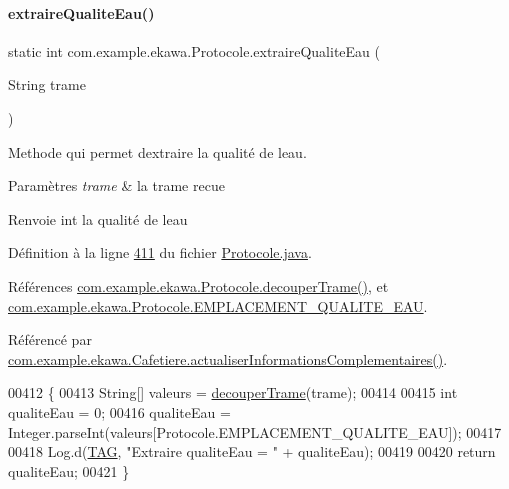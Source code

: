 \paragraph{\texorpdfstring{extraire\+Qualite\+Eau()}{extraireQualiteEau()}}
{\footnotesize\ttfamily static int com.\+example.\+ekawa.\+Protocole.\+extraire\+Qualite\+Eau (\begin{DoxyParamCaption}\item[{String}]{trame }\end{DoxyParamCaption})\hspace{0.3cm}{\ttfamily [static]}}



Methode qui permet d\textquotesingle{}extraire la qualité de l\textquotesingle{}eau. 


\begin{DoxyParams}{Paramètres}
{\em trame} & la trame recue \\
\hline
\end{DoxyParams}
\begin{DoxyReturn}{Renvoie}
int la qualité de l\textquotesingle{}eau 
\end{DoxyReturn}


Définition à la ligne \hyperlink{_protocole_8java_source_l00411}{411} du fichier \hyperlink{_protocole_8java_source}{Protocole.\+java}.



Références \hyperlink{_protocole_8java_source_l00208}{com.\+example.\+ekawa.\+Protocole.\+decouper\+Trame()}, et \hyperlink{_protocole_8java_source_l00068}{com.\+example.\+ekawa.\+Protocole.\+E\+M\+P\+L\+A\+C\+E\+M\+E\+N\+T\+\_\+\+Q\+U\+A\+L\+I\+T\+E\+\_\+\+E\+AU}.



Référencé par \hyperlink{_cafetiere_8java_source_l00574}{com.\+example.\+ekawa.\+Cafetiere.\+actualiser\+Informations\+Complementaires()}.


\begin{DoxyCode}
00412     \{
00413         String[] valeurs = \hyperlink{classcom_1_1example_1_1ekawa_1_1_protocole_a23c261e4ab5ad3c2ac60187f04ae40ea}{decouperTrame}(trame);
00414 
00415         \textcolor{keywordtype}{int} qualiteEau = 0;
00416         qualiteEau = Integer.parseInt(valeurs[Protocole.EMPLACEMENT\_QUALITE\_EAU]);
00417 
00418         Log.d(\hyperlink{classcom_1_1example_1_1ekawa_1_1_protocole_ae9b68fa0daac528421b887f19413f8f5}{TAG}, \textcolor{stringliteral}{"Extraire qualiteEau = "} + qualiteEau);
00419 
00420         \textcolor{keywordflow}{return} qualiteEau;
00421     \}
\end{DoxyCode}
\mbox{\label{classcom_1_1example_1_1ekawa_1_1_protocole_a4997ef198a7f87d76c2f68849caae8d7}} 
